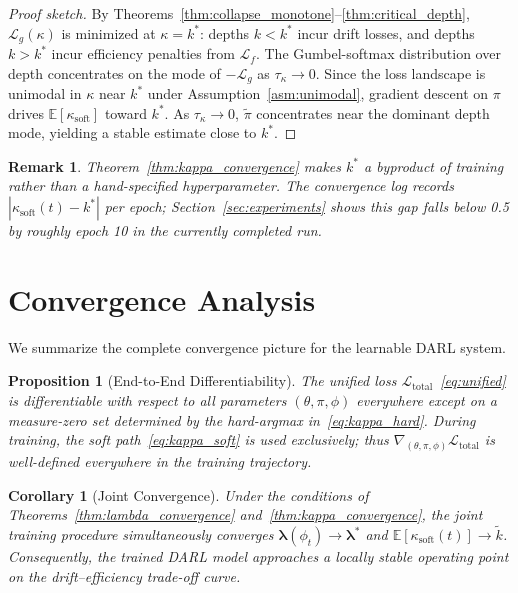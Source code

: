 \documentclass[lettersize,journal]{IEEEtran}
\newtheorem{corollary}[theorem]{Corollary}
\newtheorem{proposition}[theorem]{Proposition}
\newtheorem{remark}{Remark}
\newcommand{\E}{\mathbb{E}}
\newcommand{\calL}{\mathcal{L}}
\newcommand{\lambdavec}{\boldsymbol{\lambda}}
\begin{document}
\begin{proof}[Proof sketch]
By Theorems~\ref{thm:collapse_monotone}--\ref{thm:critical_depth},
$\calL_g(\kappa)$ is minimized at $\kappa = k^*$:
depths $k < k^*$ incur drift losses, and depths $k > k^*$
incur efficiency penalties from $\calL_f$.
The Gumbel-softmax distribution over depth concentrates on
the mode of $-\calL_g$ as $\tau_\kappa \to 0$.
Since the loss landscape is unimodal in $\kappa$ near $k^*$ under
Assumption~\ref{asm:unimodal}, gradient descent on $\pi$
drives $\E[\kappa_{\text{soft}}]$ toward $k^*$.
As $\tau_\kappa \to 0$, $\tilde{\pi}$ concentrates near the dominant
depth mode, yielding a stable estimate close to $k^*$.
\end{proof}

\begin{remark}
Theorem~\ref{thm:kappa_convergence} makes $k^*$ a byproduct of
training rather than a hand-specified hyperparameter.
The convergence log records $|\kappa_{\text{soft}}(t) - k^*|$ per
epoch; Section~\ref{sec:experiments} shows this gap falls below
0.5 by roughly epoch 10 in the currently completed run.
\end{remark}


\section{Convergence Analysis}
\label{sec:theory}

We summarize the complete convergence picture for the learnable DARL system.

\begin{proposition}[End-to-End Differentiability]
The unified loss $\calL_{\text{total}}$~\eqref{eq:unified} is
differentiable with respect to all parameters
$(\theta, \pi, \phi)$ everywhere except on a measure-zero set
determined by the hard-argmax in~\eqref{eq:kappa_hard}.
During training, the soft path~\eqref{eq:kappa_soft} is used
exclusively; thus $\nabla_{(\theta,\pi,\phi)} \calL_{\text{total}}$
is well-defined everywhere in the training trajectory.
\end{proposition}

\begin{corollary}[Joint Convergence]
Under the conditions of Theorems~\ref{thm:lambda_convergence}
and~\ref{thm:kappa_convergence}, the joint training procedure
simultaneously converges $\lambdavec(\phi_t) \to \lambdavec^*$ and
$\E[\kappa_{\text{soft}}(t)] \to \tilde{k}$.
Consequently, the trained DARL model approaches a locally stable
operating point on the drift--efficiency trade-off curve.
\end{corollary}
\end{document}
